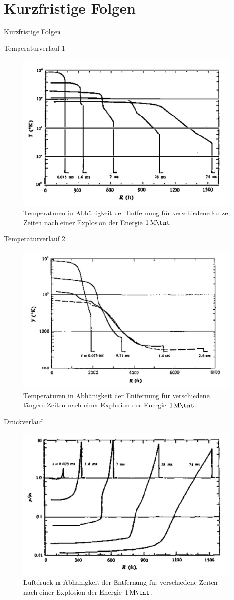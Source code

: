 \section{Kurzfristige Folgen}
\begin{frame}
	\begin{block}{Kurzfristige Folgen}
	\end{block}
\end{frame}
\begin{frame}{Temperaturverlauf 1}
\begin{figure}
	\centering
	\includegraphics[width=0.5\linewidth]{img/img1}
	\caption{Temperaturen in Abhänigkeit der Entfernung für verschiedene kurze Zeiten nach einer Explosion der Energie $\SI{1}{\mega \tnt}$.\cite{AnnuRev18_1}}
\end{figure}
\end{frame}
\begin{frame}{Temperaturverlauf 2}
	\begin{figure}
		\centering
		\includegraphics[width=0.5\linewidth]{img/img3.jpg}
		\caption{Temperaturen in Abhänigkeit der Entfernung für verschiedene längere Zeiten nach einer Explosion der Energie $\SI{1}{\mega \tnt}$.\cite{AnnuRev18_1}}
	\end{figure}
\end{frame}
\begin{frame}{Druckverlauf}
	\begin{figure}
		\centering
		\includegraphics[width=0.5\linewidth]{img/img2.jpg}
		\caption{Luftdruck in Abhänigkeit der Entfernung für verschiedene Zeiten nach einer Explosion der Energie $\SI{1}{\mega \tnt}$.\cite{AnnuRev18_1}}
	\end{figure}
\end{frame}
